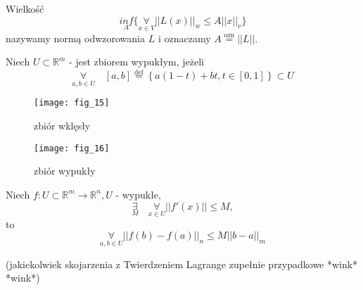 \documentclass[../main.tex]{subfiles}
\begin{document}
\begin{definicja}
    Wielkość
    \[
        \underset{A}{inf} \{\underset{x\in V}{\forall}||L(x)||_w \leq A||x||_v\}
    \]
    nazywamy normą odwzorowania $L$ i oznaczamy $A\overset{\text{ozn}}{=}||L||$.
\end{definicja}
\begin{definicja}
    Niech $U\subset \mathbb{R}^m$ - jest zbiorem wypukłym, jeżeli
    \[
        \underset{a,b\in U}{\forall}\quad [a,b]\overset{\text{def}}{=} \left \{ a(1-t)+bt, t\in[0,1] \right \} \subset U
    \]
\end{definicja}
\begin{figure}
    \centering
    \texttt{[image: fig\_15]}
    \caption{zbiór wklęsły}
\end{figure}
\begin{figure}
    \centering
    \texttt{[image: fig\_16]}
    \caption{zbiór wypukły}
\end{figure}
\begin{stw}
    Niech $f: U\subset \mathbb{R}^m \to \mathbb{R}^n, U$ - wypukłe,
    \[
        \underset{M}{\exists}\quad \underset{x\in U}{\forall}||f'(x)||\leq M
    ,\]
to
    \[
        \underset{a,b\in U}{\forall}||f(b)-f(a)||_n \leq M||b-a||_m
    \] \begin{tiny}(jakiekolwiek skojarzenia z Twierdzeniem Lagrange zupełnie przypadkowe *wink* *wink*)\end{tiny}
\end{stw}
\end{document}
